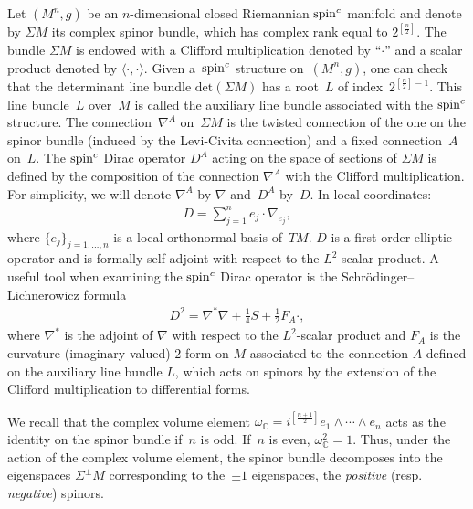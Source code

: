 \documentclass[10pt,a4paper]{amsart}
\numberwithin{equation}{section}
\theoremstyle{definition}
\begin{document}
Let $(M^{n}, g)$ be an $n$-dimensional closed Riemannian ${\mathop{\rm spin}^c}$  manifold and denote by $\Sigma M$ its complex spinor bundle,
which has complex rank equal to $2^{[\frac{n}{2}]}$. The bundle $\Sigma M$ is endowed with a Clif\/ford multiplication denoted by ``$\cdot$'' and a scalar product denoted by $\langle \cdot, \cdot\rangle$.
Given a~${\mathop{\rm spin}^c}$ structure on~$(M^{n}, g)$, one can check that the
determinant line bundle $\mathrm{det}(\Sigma M)$ has a root~$L$ of index~$2^{[\frac
{n}{2}]-1}$. This line bundle~$L$ over~$M$ is called the auxiliary line bundle associated with the
${\mathop{\rm spin}^c}$ structure.
The connection~$\nabla^A$ on~$\Sigma M$ is the twisted connection of the one on the spinor bundle (induced
by the Levi-Civita connection) and a f\/ixed connection~$A$ on~$L$.
The ${\mathop{\rm spin}^c}$ Dirac operator $D^A$ acting on the space of sections of $\Sigma M$
is def\/ined by the composition of the connection $\nabla^A$ with the Clif\/ford
multiplication. For simplicity, we will denote $\nabla^A$ by $\nabla$ and~$D^A$ by~$D$.
In local coordinates:
\begin{gather*}
D =\sum_{j=1}^{n} e_j \cdot \nabla_{e_j},
\end{gather*}
where $\{e_j\}_{j=1,\dots, n}$ is a local orthonormal basis of~$TM$.
$D$ is a f\/irst-order elliptic operator and is formally self-adjoint with respect to the $L^2$-scalar product.
A useful tool when examining the ${\mathop{\rm spin}^c}$ Dirac operator is the
Schr\"{o}dinger--Lichnerowicz formula
\begin{gather}
D^2 = \nabla^*\nabla + \frac 14 S +
\frac{1}{2}F_A \cdot,
\label{sl}
\end{gather}
where $\nabla^*$ is the adjoint of $\nabla$ with respect to the $L^2$-scalar
product  and $F_A$ is the curvature (imaginary-valued) $2$-form on $M$ associated to the connection $A$ def\/ined on the auxiliary line bundle $L$, which acts on spinors by the extension of the Clif\/ford multiplication to dif\/ferential forms.

We recall that the complex volume element $\omega_{\mathbb{C}}=i^{[\frac{n+1}{2}]} e_1\wedge \cdots \wedge e_n$ acts as the identity on the spinor bundle if~$n$ is odd. If~$n$ is even,  $\omega_{\mathbb C}^2=1$. Thus, under the action of the complex volume element, the spinor bundle  decomposes into the  eigenspaces $\Sigma^{\pm} M$ corresponding to the~$\pm 1$ eigenspaces, the {\it positive} (resp. {\it negative}) spinors.
\end{document}

